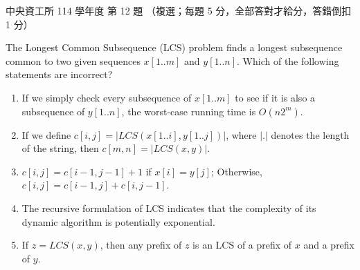 \begin{pastexam}[label={px:ncu-114-dsa-12}]{中央資工所 114 學年度 第 12 題}
（複選；每題 5 分，全部答對才給分，答錯倒扣 1 分）

The Longest Common Subsequence (LCS) problem finds a longest subsequence common to two given sequences
$x[1..m]$ and $y[1..n]$. Which of the following statements are incorrect?
\begin{enumerate}[label=(\alph*)]
\item If we simply check every subsequence of $x[1..m]$ to see if it is also a subsequence of $y[1..n]$,
the worst-case running time is $O(n2^m)$.
\item If we define $c[i,j]=|LCS(x[1..i],y[1..j])|$, where $|.|$ denotes the length of the string, then
$c[m,n]=|LCS(x,y)|$.
\item $c[i,j]=c[i-1,j-1]+1$ if $x[i]=y[j]$; Otherwise, $c[i,j]=c[i-1,j]+c[i,j-1]$.
\item The recursive formulation of LCS indicates that the complexity of its dynamic algorithm is
potentially exponential.
\item If $z=LCS(x,y)$, then any prefix of $z$ is an LCS of a prefix of $x$ and a prefix of $y$.
\end{enumerate}
\end{pastexam}

